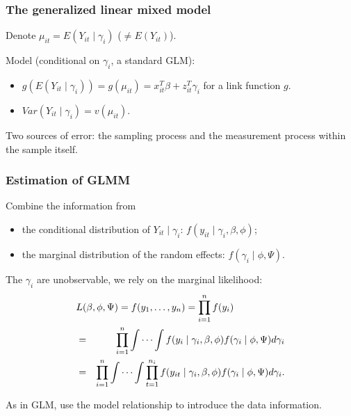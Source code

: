 \documentclass{beamer}
\newcommand{\bs}{\bigskip}
\begin{document}
\begin{frame}
\frametitle{The generalized linear mixed model}

\bs
Denote $\mu_{it} = E(Y_{it} \mid \gamma_i)$ ($\neq E(Y_{it})$).

\bs
Model (conditional on $\gamma_i$, a standard GLM):
\begin{itemize}
\item $g(E(Y_{it} \mid \gamma_i)) = g(\mu_{it}) =  x_{it}^T \beta + z_{it}^T \gamma_i$
  for a link function $g$. 
\item $Var(Y_{it} \mid \gamma_i) = v(\mu_{it})$.
\end{itemize}

\bs
Two sources of error: the sampling process and the measurement process
within the sample itself.
\end{frame}

\begin{frame}
\frametitle{Estimation of GLMM}

Combine the information from
\begin{itemize}
\item the conditional distribution of $Y_{it}
\mid \gamma_i$: $f(y_{it} \mid \gamma_i, \beta, \phi)$;
\item the marginal distribution of the random effects: $f(\gamma_i \mid
\phi, \Psi)$. 
\end{itemize}

\bs
The $\gamma_i$ are unobservable, we rely on the marginal likelihood: 
\begin{eqnarray*}
\lefteqn{L(\beta,\phi, \Psi) = f(y_1,\ldots,y_n)= \prod_{i=1}^n f(y_i) }\\
& = & \prod_{i=1}^n \int \cdots \int f(y_{i} \mid \gamma_i, \beta, \phi)f(\gamma_i \mid \phi, \Psi) d \gamma_i  \\
& = & \prod_{i=1}^n \int \cdots \int \prod_{t=1}^{n_i} f(y_{it} \mid \gamma_i,
\beta, \phi) f(\gamma_i \mid \phi, \Psi) d \gamma_i.
\end{eqnarray*}

As in GLM, use the model relationship to introduce the data information.

\end{frame}
\end{document}
